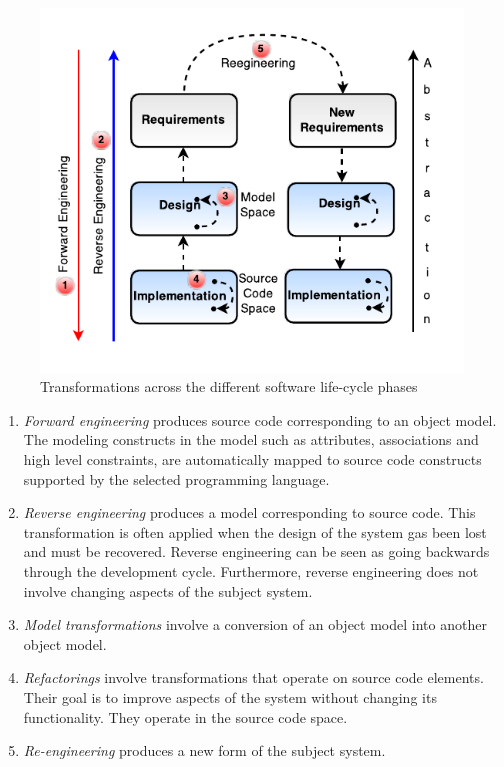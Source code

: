 \begin{figure}[h]
\centering
\includegraphics{Figures/transformationsRE}
\caption{Transformations across the different software life-cycle phases}
\label{fig:re}
\end{figure}

\begin{enumerate}
\item \textit{Forward engineering} produces source code corresponding to an object model. The modeling constructs in the model such as attributes, associations and high level constraints, are automatically mapped to source code constructs supported by the selected programming language. 
\item \textit{Reverse engineering} produces a model corresponding to source code. This transformation is often applied when the design of the system gas been lost and must be recovered. Reverse engineering can be seen as going backwards through the development cycle. Furthermore, reverse engineering does not involve changing aspects of the subject system. 
\item \textit{Model transformations} involve a conversion of an object model into another object model. 
\item \textit{Refactorings} involve transformations that operate on source code elements. Their goal is to improve aspects of the system without changing its functionality. They operate in the source code space.
\item \textit{Re-engineering} produces a new form of the subject system. 
\end{enumerate}

